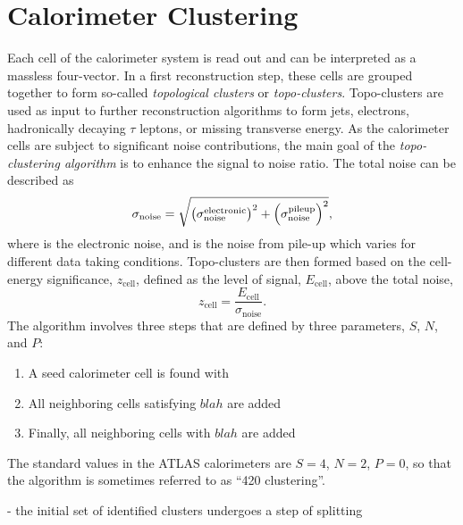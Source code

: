 \section{Calorimeter Clustering}
Each cell of the calorimeter system is read out and can be interpreted as a massless four-vector. In a first reconstruction step, these cells are grouped together to form so-called \emph{topological clusters} or \emph{topo-clusters}. Topo-clusters are used as input to further reconstruction algorithms to form jets, electrons, hadronically decaying $\tau$ leptons, or missing transverse energy. 
As the calorimeter cells are subject to significant noise contributions, the main goal of the \emph{topo-clustering algorithm} is to enhance the signal to noise ratio. The total noise can be described as
\begin{equation}
    \sigma_{\text{noise}} = \sqrt{ \left( \sigma_{\text{noise}}^{\text{electronic}}  \right)^2  + \left( \sigma_{\text{noise}}^{\text{pileup}}  \right)^2 },
\end{equation}
where \electronicnoise is the electronic noise, and \pileupnoise is the noise from pile-up which varies for different data taking conditions. 
Topo-clusters are then formed based on the cell-energy significance, $z_{\text{cell}}$, defined as the level of signal, $E_{\text{cell}}$, above the total noise, 
\begin{equation}
    z_{\text{cell}} = \frac{E_{\text{cell}}}{\sigma_{\text{noise}}}. 
\end{equation}
The algorithm involves three steps that are defined by three parameters, $S$, $N$, and $P$:
\begin{enumerate}
    \item A seed calorimeter cell is found with 
    \item All neighboring cells satisfying $blah$ are added
    \item Finally, all neighboring cells with $blah$ are added
\end{enumerate}
The standard values in the ATLAS calorimeters are $S = 4$, $N = 2$, $P = 0$, so that the algorithm is sometimes referred to as ``420 clustering''. 

- the initial set of identified clusters undergoes a step of splitting

